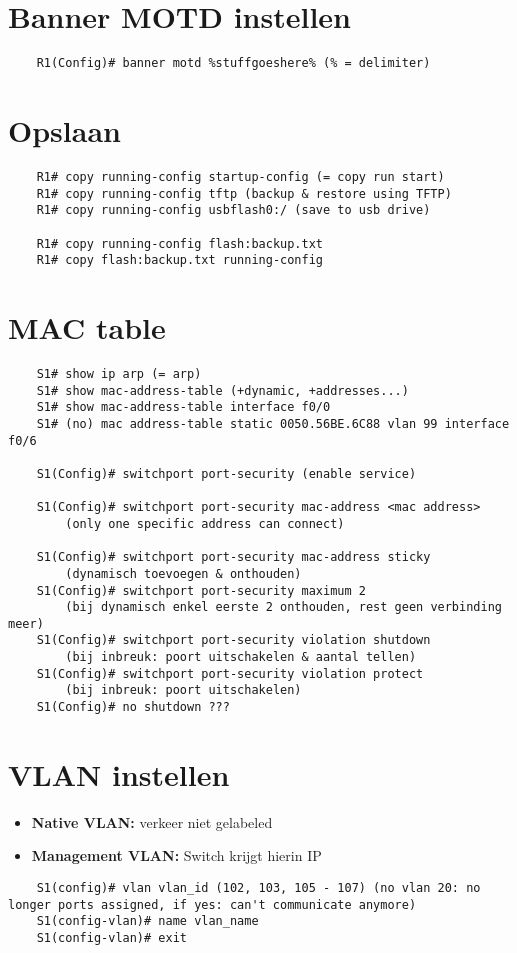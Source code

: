 \documentclass[10pt, a4paper]{article}
\begin{document}
	\section{Banner MOTD instellen}
	\begin{lstlisting}
	R1(Config)# banner motd %stuffgoeshere% (% = delimiter)
	\end{lstlisting}

	\section{Opslaan}
	\begin{lstlisting}
	R1# copy running-config startup-config (= copy run start)
	R1# copy running-config tftp (backup & restore using TFTP)
	R1# copy running-config usbflash0:/ (save to usb drive)

	R1# copy running-config flash:backup.txt
	R1# copy flash:backup.txt running-config
	\end{lstlisting}

	\section{MAC table}
	\begin{lstlisting}
	S1# show ip arp (= arp)
	S1# show mac-address-table (+dynamic, +addresses...)
	S1# show mac-address-table interface f0/0
	S1# (no) mac address-table static 0050.56BE.6C88 vlan 99 interface f0/6

	S1(Config)# switchport port-security (enable service)

	S1(Config)# switchport port-security mac-address <mac address>
		(only one specific address can connect)

	S1(Config)# switchport port-security mac-address sticky
		(dynamisch toevoegen & onthouden)
	S1(Config)# switchport port-security maximum 2
		(bij dynamisch enkel eerste 2 onthouden, rest geen verbinding meer)
	S1(Config)# switchport port-security violation shutdown
		(bij inbreuk: poort uitschakelen & aantal tellen)
	S1(Config)# switchport port-security violation protect
		(bij inbreuk: poort uitschakelen)
	S1(Config)# no shutdown ???
	\end{lstlisting}

	\section{VLAN instellen}
		\begin{itemize}[noitemsep,nolistsep]
			\item \textbf{Native VLAN:} verkeer niet gelabeled
			\item \textbf{Management VLAN:} Switch krijgt hierin IP\\
		\end{itemize}
	\begin{lstlisting}
	S1(config)# vlan vlan_id (102, 103, 105 - 107) (no vlan 20: no longer ports assigned, if yes: can't communicate anymore)
	S1(config-vlan)# name vlan_name
	S1(config-vlan)# exit
	\end{lstlisting}
\end{document}
